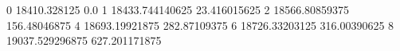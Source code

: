 0 18410.328125 0.0
1 18433.744140625 23.416015625
2 18566.80859375 156.48046875
4 18693.19921875 282.87109375
6 18726.33203125 316.00390625
8 19037.529296875 627.201171875
